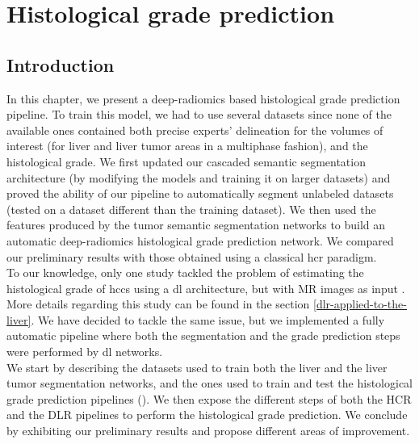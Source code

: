 \chapter{Histological grade prediction}


\section{Introduction}


In this chapter, we present a deep-radiomics based histological grade prediction pipeline. To train this model, we had to use several datasets since none of the available ones contained both precise experts' delineation for the volumes of interest (for liver and liver tumor areas in a multiphase fashion), and the histological grade.
We first updated our cascaded semantic segmentation architecture (by modifying the models and training it on larger datasets) and proved the ability of our pipeline to automatically segment unlabeled datasets (tested on a dataset different than the training dataset). We then used the features produced by the tumor semantic segmentation networks to build an automatic deep-radiomics histological grade prediction network. We compared our preliminary results with those obtained using a classical \ac{hcr} paradigm. \\
To our knowledge, only one study tackled the problem of estimating the
histological grade of \ac{hcc}s using a \ac{dl} architecture, but with MR images
as input \cite{Yang2019}. More details regarding this study can be found in the section \ref{dlr-applied-to-the-liver}.
We have decided to tackle the same issue, but we implemented a fully
automatic pipeline where both the segmentation and the grade prediction
steps were performed by \ac{dl} networks.\\
We start by describing the datasets used to train both the liver and the liver tumor segmentation networks, and the ones used to train and test the histological grade prediction pipelines (\textbf{}). We then expose the different steps of both the HCR and the DLR pipelines to perform the histological grade prediction. We conclude by exhibiting our preliminary results and propose different areas of improvement.




